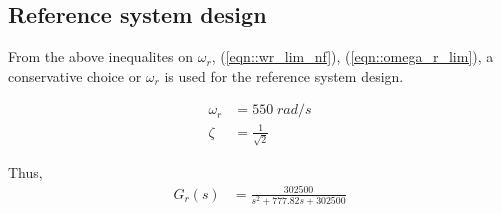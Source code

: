 
\subsection{Reference system design}
From the above inequalites on $\omega_r$, (\ref{eqn::wr_lim_nf}),
(\ref{eqn::omega_r_lim}), a conservative choice or $\omega_r$ is used for the
reference system design.

\begin{align}
    \omega_r &= 550 \; rad/s\\
    \zeta &= \frac{1}{\sqrt{2}}
\end{align}

Thus,
\begin{align}
    G_r (s) &= \frac{302500}{s^2 + 777.82 s + 302500}
\end{align}
